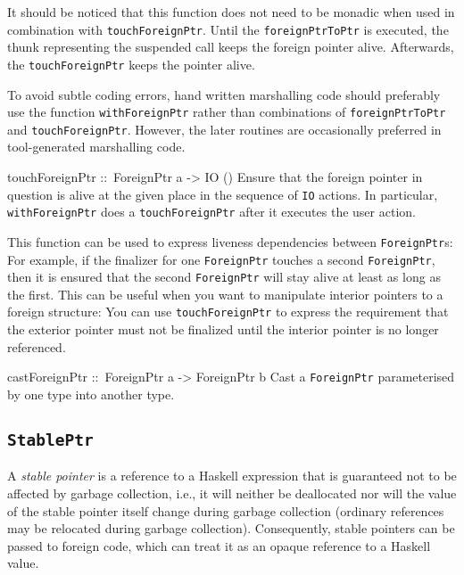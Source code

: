 \documentclass[a4paper,twoside]{article}
\makeatletter
\newcommand{\code}[1]{\texttt{#1}}      %
\newenvironment{codedesc}{%
  \list{}{\labelwidth\z@
    \let\makelabel\codedesclabel}
  }{%
  \endlist
  }
\newcommand*{\codedesclabel}[1]{%
  \hspace{-\leftmargin}
  \parbox[b]{\labelwidth}{\makebox[0pt][l]{\code{#1}}\\}\hfil\relax
  }
\makeatother
\begin{document}
\begin{codedesc}
  It should be noticed that this function does not need to be monadic when
  used in combination with \code{touchForeignPtr}.  Until the
  \code{foreignPtrToPtr} is executed, the thunk representing the suspended
  call keeps the foreign pointer alive.  Afterwards, the
  \code{touchForeignPtr} keeps the pointer alive.
  
  To avoid subtle coding errors, hand written marshalling code should
  preferably use the function \code{withForeignPtr} rather than combinations
  of \code{foreignPtrToPtr} and \code{touchForeignPtr}. However, the later
  routines are occasionally preferred in tool-generated marshalling code.
  
\item[touchForeignPtr ::\ ForeignPtr a -> IO ()] Ensure that the foreign
  pointer in question is alive at the given place in the sequence of \code{IO}
  actions. In particular, \code{withForeignPtr} does a \code{touchForeignPtr}
  after it executes the user action.
  
  This function can be used to express liveness dependencies between
  \code{ForeignPtr}s: For example, if the finalizer for one \code{ForeignPtr}
  touches a second \code{ForeignPtr}, then it is ensured that the second
  \code{ForeignPtr} will stay alive at least as long as the first. This can be
  useful when you want to manipulate interior pointers to a foreign structure:
  You can use \code{touchForeignPtr} to express the requirement that the
  exterior pointer must not be finalized until the interior pointer is no
  longer referenced.
    
\item[castForeignPtr ::\ ForeignPtr a -> ForeignPtr b] Cast a
  \code{ForeignPtr} parameterised by one type into another type.
\end{codedesc}

\subsection{\code{StablePtr}}
\label{sec:StablePtr}

A \emph{stable pointer} is a reference to a Haskell expression that is
guaranteed not to be affected by garbage collection, i.e., it will neither be
deallocated nor will the value of the stable pointer itself change during
garbage collection (ordinary references may be relocated during garbage
collection).  Consequently, stable pointers can be passed to foreign code,
which can treat it as an opaque reference to a Haskell value.
\end{document}
